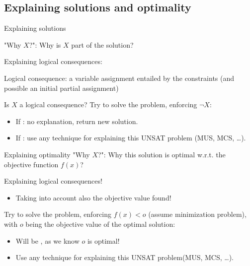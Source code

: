 \documentclass{cons-beamer}
\begin{document}
\subsection{Explaining solutions and optimality}

\begin{frame}{Explaining solutions}
      
  "Why $X$?": Why is $X$ part of the solution?
  \vfill

  Explaining logical consequences:
  \begin{definition}
    Logical consequence: a variable assignment entailed by the constraints (and possible an initial partial assignment)
  \end{definition}
  \vfill

  Is $X$ a logical consequence? Try to solve the problem, enforcing $\neg X$:
  \begin{itemize}
    \item If : no explanation, return new solution.
    \item If : use any technique for explaining this UNSAT problem (MUS, MCS, \dots).
  \end{itemize}
\end{frame}

\begin{frame}{Explaining optimality}
  "Why $X$?": Why this solution is optimal w.r.t. the objective function $f(x)$?
  \vfill

  Explaining logical consequences!
  \begin{itemize}
    \item Taking into account also the objective value found!
  \end{itemize}
  \vfill

  Try to solve the problem, enforcing $f(x) < o$ (assume minimization problem),\\ with $o$ being the objective value of the optimal solution:
  \begin{itemize}
    \item Will be , as we know $o$ is optimal!
    \item Use any technique for explaining this UNSAT problem(MUS, MCS, \dots).
  \end{itemize}
\end{frame}
\end{document}
